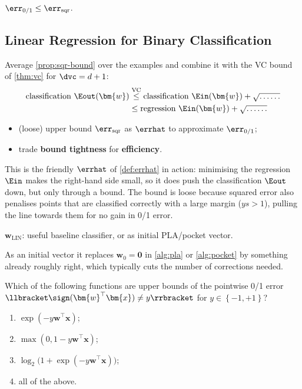 \begin{moral}
    \(\err_{0/1} \le \err_{\mathrm{sqr}}\).
\end{moral}

\subsection{Linear Regression for Binary Classification}

Average \autoref{prop:sqr-bound} over the examples and combine it with the VC
bound of \autoref{thm:vc} for \(\dvc = d + 1\):
\[
    \begin{aligned}
        \text{classification } \Eout(\bm{w})
        &\overset{\text{VC}}{\le} \text{classification } \Ein(\bm{w}) +
        \sqrt{\dots \dots}\\
        &\le \text{regression } \Ein(\bm{w}) + \sqrt{\dots \dots}
    \end{aligned}
\]

\begin{itemize}
    \item (loose) upper bound \(\err_{\mathrm{sqr}}\) as \(\errhat\) to
        approximate \(\err_{0/1}\);
    \item trade \textbf{bound tightness} for \textbf{efficiency}.
\end{itemize}

This is the friendly \(\errhat\) of \autoref{def:errhat} in action: minimising
the regression \(\Ein\) makes the right-hand side small, so it does push the
classification \(\Eout\) down, but only through a bound. The bound is loose
because squared error also penalises points that are classified correctly with
a large margin (\(ys > 1\)), pulling the line towards them for no gain in 0/1
error.

\begin{moral}
    \(\bm{w}_{\mathrm{LIN}}\): useful baseline classifier, or as initial
    PLA/pocket vector.
\end{moral}

As an initial vector it replaces \(\bm{w}_0 = \bm{0}\) in \autoref{alg:pla}
or \autoref{alg:pocket} by something already roughly right, which typically
cuts the number of corrections needed.

\begin{exercise}
    Which of the following functions are upper bounds of the pointwise 0/1
    error \(\llbracket \sign(\bm{w}^\top \bm{x}) \neq y \rrbracket\) for \(y
    \in \left\{ -1, +1 \right\}\)?
    \begin{enumerate}[(1)]
        \item \(\exp(-y \bm{w}^\top \bm{x})\);
        \item \(\max(0, 1 - y \bm{w}^\top \bm{x})\);
        \item \(\log_2 \bigl( 1 + \exp(-y \bm{w}^\top \bm{x}) \bigr)\);
        \item all of the above.
    \end{enumerate}
\end{exercise}

